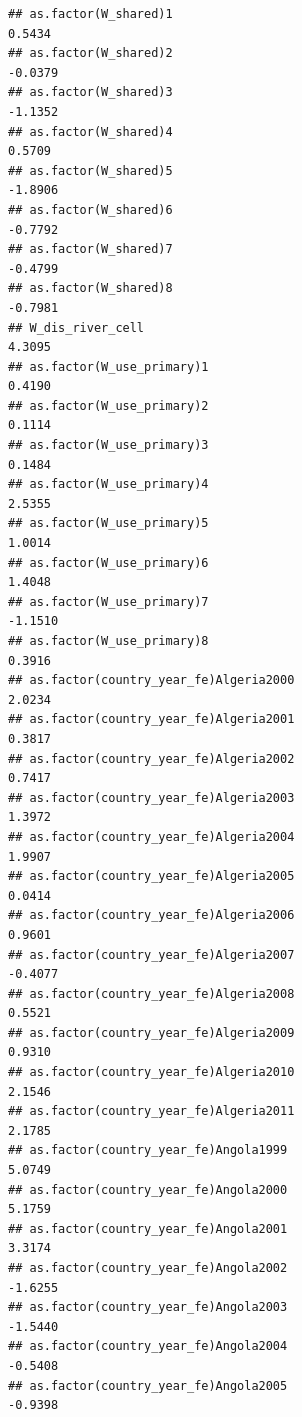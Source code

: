 \documentclass[
  a4paper,
]{article}
\begin{document}
\begin{verbatim}
## as.factor(W_shared)1                                            0.5434
## as.factor(W_shared)2                                           -0.0379
## as.factor(W_shared)3                                           -1.1352
## as.factor(W_shared)4                                            0.5709
## as.factor(W_shared)5                                           -1.8906
## as.factor(W_shared)6                                           -0.7792
## as.factor(W_shared)7                                           -0.4799
## as.factor(W_shared)8                                           -0.7981
## W_dis_river_cell                                                4.3095
## as.factor(W_use_primary)1                                       0.4190
## as.factor(W_use_primary)2                                       0.1114
## as.factor(W_use_primary)3                                       0.1484
## as.factor(W_use_primary)4                                       2.5355
## as.factor(W_use_primary)5                                       1.0014
## as.factor(W_use_primary)6                                       1.4048
## as.factor(W_use_primary)7                                      -1.1510
## as.factor(W_use_primary)8                                       0.3916
## as.factor(country_year_fe)Algeria2000                           2.0234
## as.factor(country_year_fe)Algeria2001                           0.3817
## as.factor(country_year_fe)Algeria2002                           0.7417
## as.factor(country_year_fe)Algeria2003                           1.3972
## as.factor(country_year_fe)Algeria2004                           1.9907
## as.factor(country_year_fe)Algeria2005                           0.0414
## as.factor(country_year_fe)Algeria2006                           0.9601
## as.factor(country_year_fe)Algeria2007                          -0.4077
## as.factor(country_year_fe)Algeria2008                           0.5521
## as.factor(country_year_fe)Algeria2009                           0.9310
## as.factor(country_year_fe)Algeria2010                           2.1546
## as.factor(country_year_fe)Algeria2011                           2.1785
## as.factor(country_year_fe)Angola1999                            5.0749
## as.factor(country_year_fe)Angola2000                            5.1759
## as.factor(country_year_fe)Angola2001                            3.3174
## as.factor(country_year_fe)Angola2002                           -1.6255
## as.factor(country_year_fe)Angola2003                           -1.5440
## as.factor(country_year_fe)Angola2004                           -0.5408
## as.factor(country_year_fe)Angola2005                           -0.9398

\end{verbatim}
\end{document}
